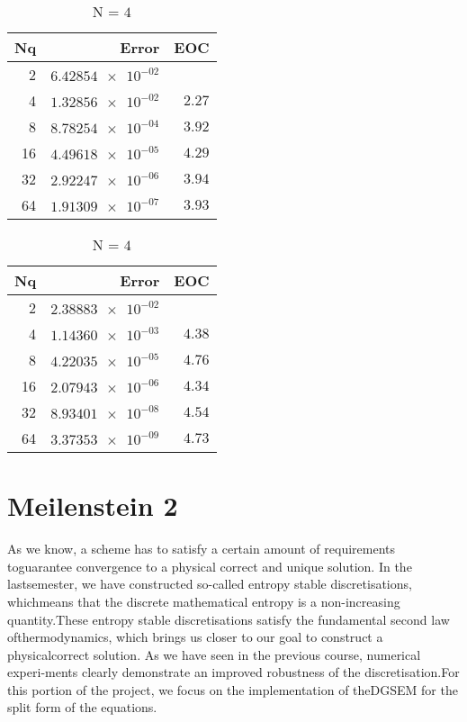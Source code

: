 \documentclass[11pt]{scrartcl}
\begin{document}
\begin{table}[H]
\parbox{.45\linewidth}{
\centering
    \begin{tabular}{|r|r|r|}
    \hline\hline
    \textbf{Nq} & \textbf{Error} & \textbf{EOC} \\\hline
    2 & $\num{6.42854e-02}$ & $\num{}$ \\
    4 & $\num{1.32856e-02}$ & $\num{2.27}$ \\
    8 & $\num{8.78254e-04}$ & $\num{3.92}$ \\
    16 & $\num{4.49618e-05}$ & $\num{4.29}$ \\
    32 & $\num{2.92247e-06}$ & $\num{3.94}$ \\
    64 & $\num{1.91309e-07}$ & $\num{3.93}$ \\\hline\hline
  \end{tabular} 
  \caption{N = $3$}
  }
  \parbox{.45\linewidth}{
	\centering
    \begin{tabular}{|r|r|r|}
    \hline\hline
    \textbf{Nq} & \textbf{Error} & \textbf{EOC} \\\hline
    2 & $\num{2.38883e-02}$ & $\num{}$ \\
    4 & $\num{1.14360e-03}$ & $\num{4.38}$ \\
    8 & $\num{4.22035e-05}$ & $\num{4.76}$ \\
    16 & $\num{2.07943e-06}$ & $\num{4.34}$ \\
    32 & $\num{8.93401e-08}$ & $\num{4.54}$ \\
    64 & $\num{3.37353e-09}$ & $\num{4.73}$ \\\hline\hline
  \end{tabular}
   \caption{N = $4$}
  }
\end{table}

\newpage
\section{Meilenstein 2}
As we know, a scheme has to satisfy a certain amount of requirements toguarantee convergence to a physical correct and unique solution. In the lastsemester, we have constructed so-called entropy stable discretisations, whichmeans that the discrete mathematical entropy is a non-increasing quantity.These entropy stable discretisations satisfy the fundamental second law ofthermodynamics, which brings us closer to our goal to construct a physicalcorrect solution. As we have seen in the previous course, numerical experi-ments clearly demonstrate an improved robustness of the discretisation.For this portion of the project, we focus on the implementation of theDGSEM for the split form of the equations.
\end{document}
